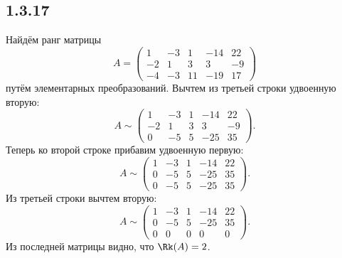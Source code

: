 \subsection{1.3.17}

Найдём ранг матрицы
\[
A=
\begin{pmatrix}
	1 & -3 & 1 & -14 & 22 \\
	-2 & 1 & 3 & 3 & -9 \\
	-4 & -3 & 11 & -19 & 17
\end{pmatrix}
\]
путём элементарных преобразований. Вычтем из третьей строки удвоенную вторую:
\[
A\sim
\begin{pmatrix}
	1 & -3 & 1 & -14 & 22 \\
	-2 & 1 & 3 & 3 & -9 \\
	0 & -5 & 5 & -25 & 35
\end{pmatrix}.
\]
Теперь ко второй строке прибавим удвоенную первую:
\[
A\sim
\begin{pmatrix}
	1 & -3 & 1 & -14 & 22 \\
	0 & -5 & 5 & -25 & 35 \\
	0 & -5 & 5 & -25 & 35
\end{pmatrix}.
\]
Из третьей строки вычтем вторую:
\[
A\sim
\begin{pmatrix}
	1 & -3 & 1 & -14 & 22 \\
	0 & -5 & 5 & -25 & 35 \\
	0 & 0 & 0 & 0 & 0
\end{pmatrix}.
\]
Из последней матрицы видно, что $\Rk(A)=2$.
